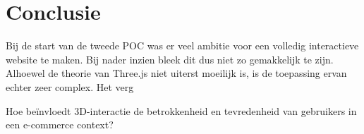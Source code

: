 
\chapter{Conclusie}%
\label{ch:conclusie}



Bij de start van de tweede POC was er veel ambitie voor een volledig interactieve website te maken. Bij nader inzien bleek dit dus niet zo gemakkelijk te zijn. Alhoewel de theorie van Three.js niet uiterst moeilijk is, is de toepassing ervan echter zeer complex. Het verg

\begin{*omgeving-naam*}
	\item[2.] Hoe beïnvloedt 3D-interactie de betrokkenheid en tevredenheid van gebruikers in een e-commerce context?
\end{*omgeving-naam*}